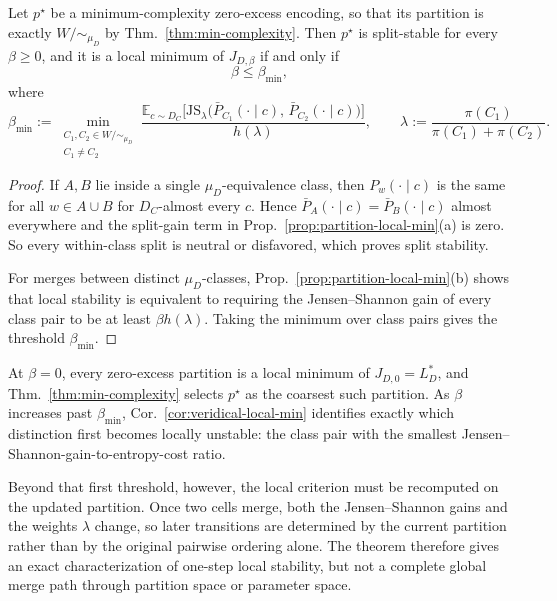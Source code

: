 \documentclass[twoside,11pt]{article}
\newcommand{\E}{\mathbb{E}}
\newcommand{\JS}{\mathrm{JS}}
\newcommand{\thmref}[1]{Thm.~\ref{#1}}
\newcommand{\propref}[1]{Prop.~\ref{#1}}
\newcommand{\corref}[1]{Cor.~\ref{#1}}
\begin{document}
\begin{corollary}\label{cor:veridical-local-min}
Let $p^\star$ be a minimum-complexity zero-excess encoding, so that its partition is exactly $W/{\sim_{\mu_D}}$ by \thmref{thm:min-complexity}. Then $p^\star$ is split-stable for every $\beta \ge 0$, and it is a local minimum of $J_{D,\beta}$ if and only if
\[
\beta \le \beta_{\min},
\]
where
\[
\beta_{\min}
:=
\min_{\substack{C_1,C_2 \in W/{\sim_{\mu_D}}\\ C_1 \neq C_2}}
\frac{
\E_{c \sim D_C}\bigl[
  \JS_{\lambda}\bigl(\bar P_{C_1}(\cdot \mid c),\, \bar P_{C_2}(\cdot \mid c)\bigr)
\bigr]
}{
h(\lambda)
},
\qquad
\lambda := \frac{\pi(C_1)}{\pi(C_1)+\pi(C_2)}.
\]
\end{corollary}

\begin{proof}
If $A,B$ lie inside a single $\mu_D$-equivalence class, then $P_w(\cdot \mid c)$ is the same for all $w \in A \cup B$ for $D_C$-almost every $c$. Hence $\bar P_A(\cdot \mid c)=\bar P_B(\cdot \mid c)$ almost everywhere and the split-gain term in \propref{prop:partition-local-min}(a) is zero. So every within-class split is neutral or disfavored, which proves split stability.

For merges between distinct $\mu_D$-classes, \propref{prop:partition-local-min}(b) shows that local stability is equivalent to requiring the Jensen--Shannon gain of every class pair to be at least $\beta h(\lambda)$. Taking the minimum over class pairs gives the threshold $\beta_{\min}$.
\end{proof}

\begin{remark}\label{rem:beta-path-caution}
At $\beta=0$, every zero-excess partition is a local minimum of $J_{D,0}=L_D^*$, and \thmref{thm:min-complexity} selects $p^\star$ as the coarsest such partition. As $\beta$ increases past $\beta_{\min}$, \corref{cor:veridical-local-min} identifies exactly which distinction first becomes locally unstable: the class pair with the smallest Jensen--Shannon-gain-to-entropy-cost ratio.

Beyond that first threshold, however, the local criterion must be recomputed on the updated partition. Once two cells merge, both the Jensen--Shannon gains and the weights $\lambda$ change, so later transitions are determined by the current partition rather than by the original pairwise ordering alone. The theorem therefore gives an exact characterization of one-step local stability, but not a complete global merge path through partition space or parameter space.
\end{remark}
\end{document}
